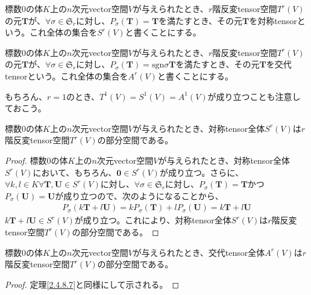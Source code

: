 \documentclass[dvipdfmx]{jsarticle}
\begin{document}
\begin{dfn}
標数$0$の体$K$上の$n$次元vector空間$V$が与えられたとき、$r$階反変tensor空間$T^{r}(V)$の元$\mathbf{T}$が、$\mathbf{\forall}\sigma \in \mathfrak{S}_{r}$に対し、$P_{\sigma}\left( \mathbf{T} \right) = \mathbf{T}$を満たすとき、その元$\mathbf{T}$を対称tensorという。これ全体の集合を$S^{r}(V)$と書くことにする。
\end{dfn}
\begin{dfn}
標数$0$の体$K$上の$n$次元vector空間$V$が与えられたとき、$r$階反変tensor空間$T^{r}(V)$の元$\mathbf{T}$が、$\mathbf{\forall}\sigma \in \mathfrak{S}_{r}$に対し、$P_{\sigma}\left( \mathbf{T} \right) = \mathrm{sgn}\sigma\mathbf{T}$を満たすとき、その元$\mathbf{T}$を交代tensorという。これ全体の集合を$A^{r}(V)$と書くことにする。
\end{dfn}\par
もちろん、$r = 1$のとき、$T^{1}(V) = S^{1}(V) = A^{1}(V)$が成り立つことも注意しておこう。
\begin{thm}\label{2.4.8.7}
標数$0$の体$K$上の$n$次元vector空間$V$が与えられたとき、対称tensor全体$S^{r}(V)$は$r$階反変tensor空間$T^{r}(V)$の部分空間である。
\end{thm}
\begin{proof}
標数$0$の体$K$上の$n$次元vector空間$V$が与えられたとき、対称tensor全体$S^{r}(V)$において、もちろん、$\mathbf{0} \in S^{r}(V)$が成り立つ。さらに、$\forall k,l \in K\forall\mathbf{T},\mathbf{U} \in S^{r}(V)$に対し、$\mathbf{\forall}\sigma \in \mathfrak{S}_{r}$に対し、$P_{\sigma}\left( \mathbf{T} \right) = \mathbf{T}$かつ$P_{\sigma}\left( \mathbf{U} \right) = \mathbf{U}$が成り立つので、次のようになることから、
\begin{align*}
P_{\sigma}\left( k\mathbf{T} + l\mathbf{U} \right) = kP_{\sigma}\left( \mathbf{T} \right) + lP_{\sigma}\left( \mathbf{U} \right) = k\mathbf{T} + l\mathbf{U}
\end{align*}
$k\mathbf{T} + l\mathbf{U} \in S^{r}(V)$が成り立つ。これにより、対称tensor全体$S^{r}(V)$は$r$階反変tensor空間$T^{r}(V)$の部分空間である。
\end{proof}
\begin{thm}\label{2.4.8.8}
標数$0$の体$K$上の$n$次元vector空間$V$が与えられたとき、交代tensor全体$A^{r}(V)$は$r$階反変tensor空間$T^{r}(V)$の部分空間である。
\end{thm}
\begin{proof} 定理\ref{2.4.8.7}と同様にして示される。
\end{proof}
\end{document}
